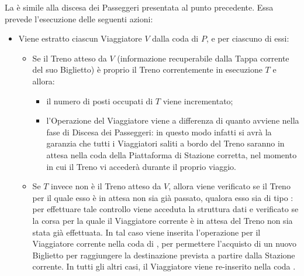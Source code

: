 \begin{description}
		La  è simile alla discesa dei Passeggeri presentata al punto precedente. Essa prevede l'esecuzione delle seguenti azioni:
		\begin{itemize}
			\item Viene estratto ciascun Viaggiatore $V$ dalla coda  di $P$, e per ciascuno di essi:
			\begin{itemize}
				\item Se il Treno atteso da $V$ (informazione recuperabile dalla Tappa corrente del suo Biglietto) è proprio il Treno correntemente in esecuzione $T$ e  allora:
					\begin{itemize}
						\item il numero di posti occupati di $T$ viene incrementato;
						\item l'Operazione  del Viaggiatore viene  a differenza di quanto avviene nella fase di Discesa dei Passeggeri: in questo modo infatti si avrà la garanzia che tutti i Viaggiatori saliti a bordo del Treno saranno in attesa nella coda  della Piattaforma di Stazione corretta, nel momento in cui il Treno vi accederà durante il proprio viaggio. 
					\end{itemize}
				\item Se $T$ invece non è il Treno atteso da $V$, allora viene verificato se il Treno per il quale esso è in attesa non sia già passato, qualora esso sia di tipo : per effettuare tale controllo viene acceduta la struttura dati  e verificato se la corsa per la quale il Viaggiatore corrente è in attesa del Treno non sia stata già effettuata. In tal caso viene inserita l'operazione  per il Viaggiatore corrente nella coda di , per permettere l'acquisto di un nuovo Biglietto per raggiungere la destinazione prevista a partire dalla Stazione corrente. In tutti gli altri casi, il Viaggiatore viene re-inserito nella coda .
			\end {itemize}
		\end{itemize}
	\end {description}


